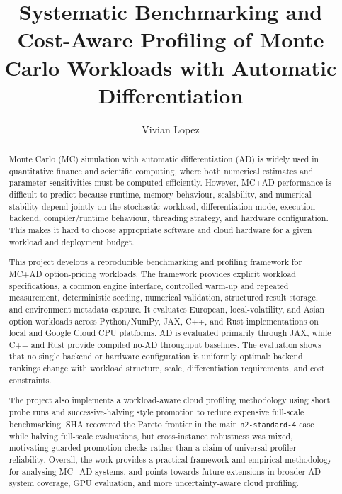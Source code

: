 \documentclass[a4paper, twoside, openany]{report}
\title{Systematic Benchmarking and Cost-Aware Profiling of Monte Carlo Workloads with Automatic Differentiation}
\author{Vivian Lopez}
\newcommand{\code}{\nolinkurl}
\begin{document}


\begin{abstract}

Monte Carlo (MC) simulation with automatic differentiation (AD) is widely used
in quantitative finance and scientific computing, where both numerical
estimates and parameter sensitivities must be computed efficiently. However,
MC+AD performance is difficult to predict because runtime, memory behaviour,
scalability, and numerical stability depend jointly on the stochastic workload,
differentiation mode, execution backend, compiler/runtime behaviour, threading
strategy, and hardware configuration. This makes it hard to choose appropriate
software and cloud hardware for a given workload and deployment budget.

This project develops a reproducible benchmarking and profiling framework for
MC+AD option-pricing workloads. The framework provides explicit workload
specifications, a common engine interface, controlled warm-up and repeated
measurement, deterministic seeding, numerical validation, structured result
storage, and environment metadata capture. It evaluates European,
local-volatility, and Asian option workloads across Python/NumPy, JAX, C++,
and Rust implementations on local and Google Cloud CPU platforms. AD is
evaluated primarily through JAX, while C++ and Rust provide compiled no-AD
throughput baselines. The evaluation shows that no single backend or hardware
configuration is uniformly optimal: backend rankings change with workload
structure, scale, differentiation requirements, and cost constraints.

The project also implements a workload-aware cloud profiling methodology using
short probe runs and successive-halving style promotion to reduce expensive
full-scale benchmarking. SHA recovered the Pareto frontier in the main
\code{n2-standard-4} case while halving full-scale evaluations, but
cross-instance robustness was mixed, motivating guarded promotion checks rather
than a claim of universal profiler reliability. Overall, the work provides a
practical framework and empirical methodology for analysing MC+AD systems, and
points towards future extensions in broader AD-system coverage, GPU evaluation,
and more uncertainty-aware cloud profiling.

\end{abstract}
\end{document}
